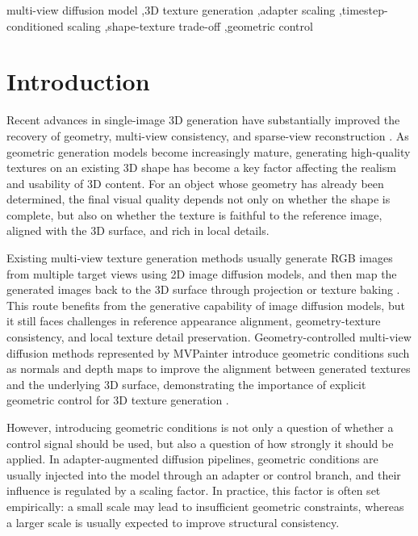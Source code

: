 \documentclass[times,twocolumn,final]{elsarticle}
\begin{document}
\begin{frontmatter}
\begin{keyword}
\KWD
multi-view diffusion model \sep 3D texture generation \sep adapter scaling \sep timestep-conditioned scaling \sep shape-texture trade-off \sep geometric control
\end{keyword}

\end{frontmatter}

\linenumbers

\section{Introduction}
\label{sec:intro}

Recent advances in single-image 3D generation have substantially improved the recovery of geometry, multi-view consistency, and sparse-view reconstruction \cite{liu2023zero1to3,shi2023zero123pp,liu2023syncdreamer,long2023wonder3d,shi2024mvdream,wang2023imagedream,xu2024instantmesh,ke2024era3d}. As geometric generation models become increasingly mature, generating high-quality textures on an existing 3D shape has become a key factor affecting the realism and usability of 3D content. For an object whose geometry has already been determined, the final visual quality depends not only on whether the shape is complete, but also on whether the texture is faithful to the reference image, aligned with the 3D surface, and rich in local details.

Existing multi-view texture generation methods usually generate RGB images from multiple target views using 2D image diffusion models, and then map the generated images back to the 3D surface through projection or texture baking \cite{chen2023text2tex,richardson2023texture,poole2023dreamfusion,chen2023fantasia3d}. This route benefits from the generative capability of image diffusion models, but it still faces challenges in reference appearance alignment, geometry-texture consistency, and local texture detail preservation. Geometry-controlled multi-view diffusion methods represented by MVPainter introduce geometric conditions such as normals and depth maps to improve the alignment between generated textures and the underlying 3D surface, demonstrating the importance of explicit geometric control for 3D texture generation \cite{shao2025mvpainter}.

However, introducing geometric conditions is not only a question of whether a control signal should be used, but also a question of how strongly it should be applied. In adapter-augmented diffusion pipelines, geometric conditions are usually injected into the model through an adapter or control branch, and their influence is regulated by a scaling factor. In practice, this factor is often set empirically: a small scale may lead to insufficient geometric constraints, whereas a larger scale is usually expected to improve structural consistency.
\end{document}
